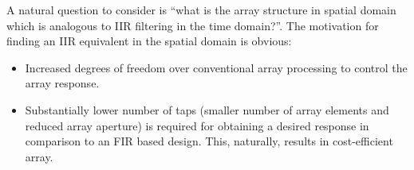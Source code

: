 A natural question to consider is ``what is the array structure in spatial domain which is analogous to IIR filtering in the time domain?''.
The motivation for finding an IIR equivalent in the spatial domain is obvious:
\begin{itemize}
\item
{
Increased degrees of freedom over conventional array processing to control the array response.
}
\item
{
Substantially lower number of taps (smaller number of array elements and reduced array aperture) is required for obtaining a desired response in comparison to an FIR based design. This, naturally, results in cost-efficient array.
}
\end{itemize}